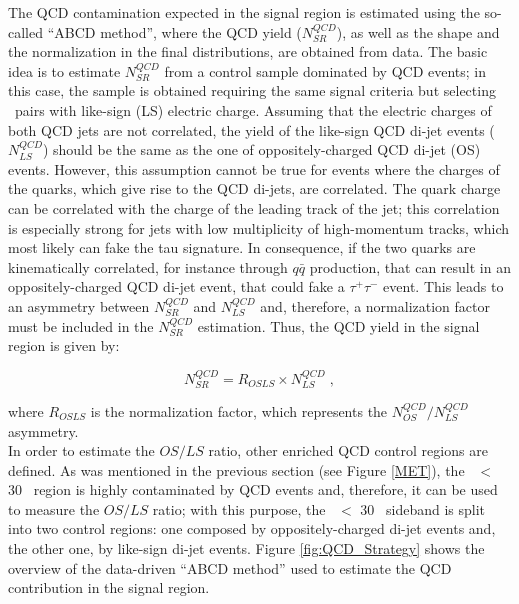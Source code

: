 \noindent The QCD contamination expected in the signal region is estimated 
using the so-called ``ABCD method'', where the QCD yield ($N_{SR}^{QCD}$),
as well as the shape and the normalization in the final 
distributions, are obtained from data. The basic idea is to
estimate $N_{SR}^{QCD}$ from a control sample dominated by QCD events; in this case, 
the sample is obtained requiring the same signal 
criteria but selecting \tauh \tauh~pairs with like-sign (LS) electric charge. Assuming 
that the electric charges of both QCD jets are not correlated, the yield of the like-sign 
QCD di-jet events ($N_{LS}^{QCD}$) should be the same 
as the one of oppositely-charged QCD di-jet (OS) events. However,
this assumption cannot be true for events where the charges of the quarks, 
which give rise to the QCD di-jets, are correlated. The quark charge can be 
correlated with the charge of the leading track of the jet; this correlation
is especially strong for jets with low multiplicity of high-momentum tracks, 
which most likely can fake the tau signature. In consequence, if the two quarks
are kinematically correlated, for instance through $q\bar{q}$ production, that can 
result in an oppositely-charged QCD di-jet event, that could fake a $\tau^{+}\tau^{-}$
event. This leads to an asymmetry between $N_{SR}^{QCD}$ 
and $N_{LS}^{QCD}$ and, therefore, a normalization factor must be included in the $N_{SR}^{QCD}$ estimation. 
Thus, the QCD yield in the signal region is given by:

\begin{equation}
 N_{SR}^{QCD} = R_{OSLS} \times N_{LS}^{QCD}\; ,
\end{equation}

\noindent where $R_{OSLS}$ is the normalization factor, which represents
the $N_{OS}^{QCD} / N_{LS}^{QCD}$ asymmetry.\\

\noindent In order to estimate the $OS/LS$ ratio, other enriched QCD control regions 
are defined. As was mentioned in the previous section (see Figure \ref{MET}), the 
\MET~$<$ 30 \GeV~region is highly contaminated by QCD events and, therefore,
it can be used to measure the $OS/LS$ ratio; with this purpose, the \MET~$<$ 30 \GeV~sideband
is split into two control regions: one composed by oppositely-charged di-jet
events and, the other one, by like-sign di-jet events. Figure \ref{fig:QCD_Strategy} shows the 
overview of the data-driven ``ABCD method'' used to estimate the 
QCD contribution in the signal region.\\

